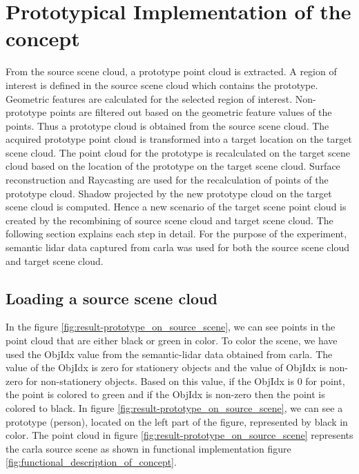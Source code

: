 \chapter{Prototypical Implementation of the concept}
From the source scene cloud, a prototype point cloud is extracted. A region of interest is defined in the source scene cloud which contains the prototype. Geometric features are calculated for the selected region of interest. Non-prototype points are filtered out based on the geometric feature values of the points. Thus a prototype cloud is obtained from the source scene cloud. The acquired prototype point cloud is transformed into a target location on the target scene cloud. The point cloud for the prototype is recalculated on the target scene cloud based on the location of the prototype on the target scene cloud. Surface reconstruction and Raycasting are used for the recalculation of points of the prototype cloud. Shadow projected by the new prototype cloud on the target scene cloud is computed. Hence a new scenario of the target scene point cloud is created by the recombining of source scene cloud and target scene cloud. The following section explains each step in detail. 
For the purpose of the experiment, semantic lidar data captured from \acrshort{carla} was used for both the source scene cloud and target scene cloud.

\section{Loading a source scene cloud}
 In the figure \ref{fig:result-prototype_on_source_scene}, we can see points in the point cloud that are either black or green in color. To color the scene, we have used the ObjIdx value from the semantic-lidar data obtained from \acrshort{carla}. The value of the ObjIdx is zero for stationery objects and the value of ObjIdx is non-zero for non-stationery objects. Based on this value, if the ObjIdx is 0 for point, the point is colored to green and if the ObjIdx is non-zero then the point is colored to black. In figure \ref{fig:result-prototype_on_source_scene}, we can see a prototype (person), located on the left part of the figure, represented by black in color. The point cloud in figure \ref{fig:result-prototype_on_source_scene} represents the \acrshort{carla} source scene as shown in functional implementation figure \ref{fig:functional_description_of_concept}.

